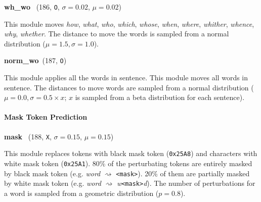\documentclass[11pt]{article}
\newenvironment{desc}{%
	\list{}{%
		\parsep 0.25em
		\topsep 0.25em
		\leftmargin 1em
		\rightmargin 0em
	}
	\item\relax
	\sloppy
}{%
	\endlist
}
\newcommand{\attr}[4]{%
	(#1, \texttt{#2}, $\sigma=#3$, $\mu=#4$)
}
\begin{document}
\noindent
\textbf{wh\_wo}~\attr{186}{O}{0.02}{0.02}

\begin{desc}
	This module moves
	\textit{how},
	\textit{what},
	\textit{who},
	\textit{which},
	\textit{whose},
	\textit{when},
	\textit{where},
	\textit{whither},
	\textit{whence},
	\textit{why},
	\textit{whether}.
	The distance to move the words is sampled from a normal distribution ($\mu=1.5, \sigma=1.0$).
\end{desc}

\noindent
\textbf{norm\_wo}~(187, \texttt{O})

\begin{desc}
	This module applies all the words in sentence.
	This module moves all words in sentence.
	The distances to move words are sampled from a normal distribution ($\mu=0.0, \sigma=0.5 \times x$; $x$ is sampled from a beta distribution for each sentence).
\end{desc}

\paragraph{Mask Token Prediction}\mbox{}

\noindent
\textbf{mask}~\attr{188}{X}{0.15}{0.15}

\begin{desc}
	This module replaces tokens with black mask token (\texttt{0x25A8}) and characters with white mask token (\texttt{0x25A1}).
	80\% of the perturbating tokens are entirely masked by black mask token (e.g. \textit{word} $\rightsquigarrow$ \texttt{<mask>}).
	20\% of them are partially masked by white mask token (e.g. \textit{word} $\rightsquigarrow$ \textit{w}\texttt{<mask>}\textit{d}).
	The number of perturbations for a word is sampled from a geometric distribution ($p=0.8$).
\end{desc}
\end{document}
